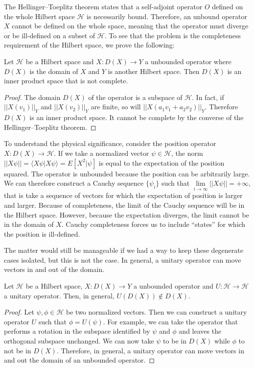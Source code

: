 \documentclass[10pt,twocolumn, nofootinbib]{revtex4-2}
\def\>{\rangle}
\def\<{\langle}
\begin{document}
The Hellinger–Toeplitz theorem states that a self-adjoint operator $O$ defined on the whole Hilbert space $\mathcal{H}$ is necessarily bound. Therefore, an unbound operator $X$ cannot be defined on the whole space, meaning that the operator must diverge or be ill-defined on a subset of $\mathcal{H}$. To see that the problem is the completeness requirement of the Hilbert space, we prove the following:
\begin{prop}
	Let $\mathcal{H}$ be a Hilbert space and $X : D(X) \to Y$ a unbounded operator where $D(X)$ is the domain of $X$ and $Y$ is another Hilbert space. Then $D(X)$ is an inner product space that is not complete.
\end{prop}
\begin{proof}
	The domain $D(X)$ of the operator is a subspace of $\mathcal{H}$. In fact, if $||X(v_1)||_Y$ and $||X(v_2)||_Y$ are finite, so will $||X(a_1 v_1+a_2v_2)||_Y$. Therefore $D(X)$ is an inner product space. It cannot be complete by the converse of the Hellinger–Toeplitz theorem.
\end{proof}

To understand the physical significance, consider the position operator $X : D(X) \to \mathcal{H}$. If we take a normalized vector $\psi \in \mathcal{H}$, the norm $||X\psi|| = \<X\psi|X\psi\> = E[X^2|\psi]$ is equal to the expectation of the position squared. The operator is unbounded because the position can be arbitrarily large. We can therefore construct a Cauchy sequence $\{\psi_i\}$ such that $\lim\limits_{i \to \infty}||X\psi|| = +\infty$, that is take a sequence of vectors for which the expectation of position is larger and larger. Because of completeness, the limit of the Cauchy sequence will be in the Hilbert space. However, because the expectation diverges, the limit cannot be in the domain of $X$. Cauchy completeness forces us to include ``states'' for which the position is ill-defined.

The matter would still be manageable if we had a way to keep these degenerate cases isolated, but this is not the case. In general, a unitary operator can move vectors in and out of the domain.
\begin{prop}
	Let $\mathcal{H}$ be a Hilbert space, $X : D(X) \to Y$ a unbounded operator and $U : \mathcal{H} \to \mathcal{H}$ a unitary operator. Then, in general, $U(D(X)) \notin D(X)$.
\end{prop}
\begin{proof}
	Let $\psi, \phi \in \mathcal{H}$ be two normalized vectors. Then we can construct a unitary operator $U$ such that $\phi = U(\psi)$. For example, we can take the operator that performs a rotation in the subspace identified by $\psi$ and $\phi$ and leaves the orthogonal subspace unchanged. We can now take $\psi$ to be in $D(X)$ while $\phi$ to not be in $D(X)$. Therefore, in general, a unitary operator can move vectors in and out the domain of an unbounded operator.
\end{proof}
\end{document}
